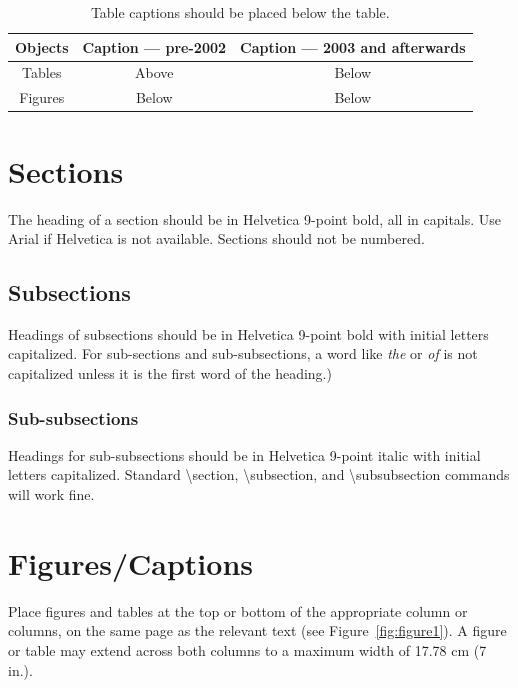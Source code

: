 \documentclass{sigchi}
\newcommand\tabhead[1]{\small\textbf{#1}}
\begin{document}
\begin{table}
  \centering
  \begin{tabular}{|c|c|c|}
    \hline
    \tabhead{Objects} &
    \multicolumn{1}{|p{0.3\columnwidth}|}{\centering\tabhead{Caption --- pre-2002}} &
    \multicolumn{1}{|p{0.4\columnwidth}|}{\centering\tabhead{Caption --- 2003 and afterwards}} \\
    \hline
    Tables & Above & Below \\
    \hline
    Figures & Below & Below \\
    \hline
  \end{tabular}
  \caption{Table captions should be placed below the table.}
  \label{tab:table1}
\end{table}

\section{Sections}

The heading of a section should be in Helvetica 9-point bold, all in
capitals. Use Arial if Helvetica is not available. Sections should
not be numbered.

\subsection{Subsections}

Headings of subsections should be in Helvetica 9-point bold with
initial letters capitalized.  For
sub-sections and sub-subsections, a word like \emph{the} or \emph{of}
is not capitalized unless it is the first word of the heading.)

\subsubsection{Sub-subsections}

Headings for sub-subsections should be in Helvetica 9-point italic
with initial letters capitalized.  Standard {\textbackslash}section,
{\textbackslash}subsection, and {\textbackslash}subsubsection commands
will work fine.

\section{Figures/Captions}

Place figures and tables at the top or bottom of the appropriate
column or columns, on the same page as the relevant text
(see Figure~\ref{fig:figure1}). A figure or table may extend across both
columns to a maximum width of 17.78 cm (7 in.).
\end{document}
